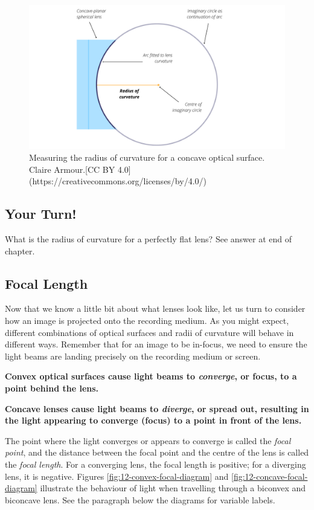 \documentclass[
]{book}
\begin{document}
\begin{figure}
\includegraphics[width=0.9\linewidth]{images/12-ROC_concave} \caption{Measuring the radius of curvature for a concave optical surface. Claire Armour.[CC BY 4.0](https://creativecommons.org/licenses/by/4.0/)}\label{fig:12-RoC-concave}
\end{figure}

\hypertarget{your-turn-4}{%
\subsection*{Your Turn!}\label{your-turn-4}}

What is the radius of curvature for a perfectly flat lens? See answer at end of chapter.

\hypertarget{focal-length}{%
\subsection{Focal Length}\label{focal-length}}

Now that we know a little bit about what lenses look like, let us turn to consider how an image is projected onto the recording medium. As you might expect, different combinations of optical surfaces and radii of curvature will behave in different ways. Remember that for an image to be in-focus, we need to ensure the light beams are landing precisely on the recording medium or screen.

\textbf{Convex optical surfaces cause light beams to \emph{converge}, or focus, to a point behind the lens.}

\textbf{Concave lenses cause light beams to \emph{diverge}, or spread out, resulting in the light appearing to converge (focus) to a point in front of the lens.}

The point where the light converges or appears to converge is called the \emph{focal point}, and the distance between the focal point and the centre of the lens is called the \emph{focal length}. For a converging lens, the focal length is positive; for a diverging lens, it is negative. Figures \ref{fig:12-convex-focal-diagram} and \ref{fig:12-concave-focal-diagram} illustrate the behaviour of light when travelling through a biconvex and biconcave lens. See the paragraph below the diagrams for variable labels.
\end{document}
